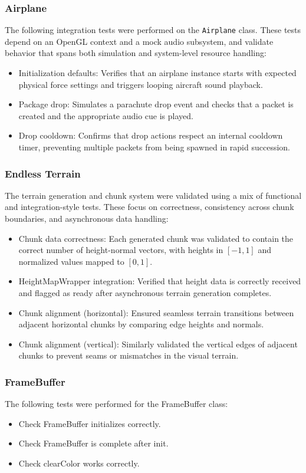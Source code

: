 \subsubsection{Airplane}
The following integration tests were performed on the \texttt{Airplane} class. These tests depend on an OpenGL context and a mock audio subsystem, and validate behavior that spans both simulation and system-level resource handling:
\begin{itemize}
    \item Initialization defaults: Verifies that an airplane instance starts with expected physical force settings and triggers looping aircraft sound playback.
    \item Package drop: Simulates a parachute drop event and checks that a packet is created and the appropriate audio cue is played.
    \item Drop cooldown: Confirms that drop actions respect an internal cooldown timer, preventing multiple packets from being spawned in rapid succession.
\end{itemize}


\subsubsection{Endless Terrain}
The terrain generation and chunk system were validated using a mix of functional and integration-style tests. These focus on correctness, consistency across chunk boundaries, and asynchronous data handling:
\begin{itemize}
    \item Chunk data correctness: Each generated chunk was validated to contain the correct number of height-normal vectors, with heights in \([-1,1]\) and normalized values mapped to \([0,1]\).
    \item HeightMapWrapper integration: Verified that height data is correctly received and flagged as ready after asynchronous terrain generation completes.
    \item Chunk alignment (horizontal): Ensured seamless terrain transitions between adjacent horizontal chunks by comparing edge heights and normals.
    \item Chunk alignment (vertical): Similarly validated the vertical edges of adjacent chunks to prevent seams or mismatches in the visual terrain.
\end{itemize}

\subsubsection{FrameBuffer}
The following tests were performed for the FrameBuffer class:
\begin{itemize}
    \item Check FrameBuffer initializes correctly.
    \item Check FrameBuffer is complete after init.
    \item Check clearColor works correctly.
\end{itemize}

